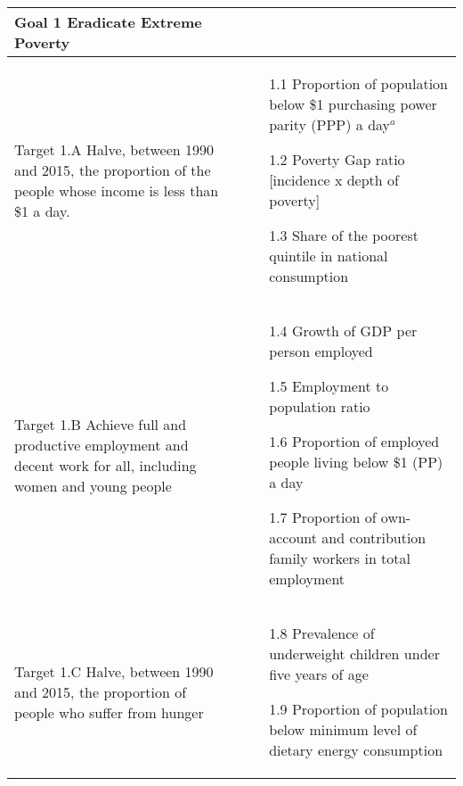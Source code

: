 \begin{center}
\begin{tabularx}{\textwidth}[t]{XX}
\arrayrulecolor{green}\hline
\textbf{\textcolor{myGreen}{Goal 1 Eradicate Extreme Poverty}} & \\
\hline
Target 1.A Halve, between 1990 and 2015, the proportion of the people whose income is less than \$1 a day. & 
\begin{minipage}[t]{\linewidth}%
\begin{itemize}
\item[1.1] Proportion of population below \$1 purchasing power parity (PPP) a day$^a$
\item[1.2] Poverty Gap ratio [incidence x depth of poverty]
\item[1.3] Share of the poorest quintile in national consumption
\end{itemize} 
\end{minipage}\\

\arrayrulecolor{black}\hline

Target 1.B Achieve full and productive employment and decent work for all, including women and young people &
\begin{minipage}[t]{\linewidth}%
\begin{itemize}
\item[1.4] Growth of GDP per person employed 
\item[1.5] Employment to population ratio
\item[1.6] Proportion of employed people living below \$1 (PP) a day
\item[1.7] Proportion of own-account and contribution family workers in total employment
\end{itemize} 
\end{minipage}\\

\hline

Target 1.C Halve, between 1990 and 2015, the proportion of people who suffer from hunger &
\begin{minipage}[t]{\linewidth}%
\begin{itemize}
\item[1.8] Prevalence of underweight children under five years of age
\item[1.9] Proportion of population below minimum level of dietary energy consumption
\end{itemize}
\end{minipage}\\


\end{tabularx}
\end{center}
